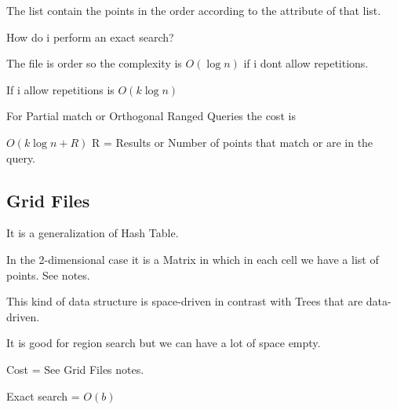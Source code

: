 \documentclass[12pt, a4paper]{article}
\begin{document}
The list contain the points in the order according to the attribute of that list.

How do i perform an exact search?

The file is order so the complexity is $O(\log{}n)$ if i dont allow repetitions.

If i allow repetitions is $O(k\log{}n)$

For Partial match or Orthogonal Ranged Queries the cost is

$O(k\log{}n + R)$ R = Results or Number of points that match or are in the query.

\subsection{Grid Files}
It is a generalization of Hash Table.

In the 2-dimensional case it is a Matrix in which in each cell we have a list of points. See notes.

This kind of data structure is space-driven in contrast with Trees that are data-driven.

It is good for region search but we can have a lot of space empty.

Cost = See Grid Files notes.

Exact search = $O(b)$
\end{document}
